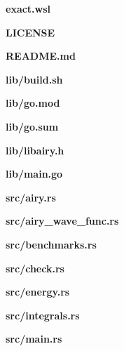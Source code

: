 \documentclass[11pt,DIV=10,final]{scrreprt} %
\begin{document}
{\begin{appendix}
\vspace*{3ex}
{\noindent \large \bfseries exact.wsl}


\vspace*{3ex}
{\noindent \large \bfseries LICENSE}


\vspace*{3ex}
{\noindent \large \bfseries README.md}


\vspace*{3ex}
{\noindent \large \bfseries lib/build.sh}


\vspace*{3ex}
{\noindent \large \bfseries lib/go.mod}


\vspace*{3ex}
{\noindent \large \bfseries lib/go.sum}


\vspace*{3ex}
{\noindent \large \bfseries lib/libairy.h}


\vspace*{3ex}
{\noindent \large \bfseries lib/main.go}


\vspace*{3ex}
{\noindent \large \bfseries src/airy.rs}


\vspace*{3ex}
{\noindent \large \bfseries src/airy\_wave\_func.rs}


\vspace*{3ex}
{\noindent \large \bfseries src/benchmarks.rs}


\vspace*{3ex}
{\noindent \large \bfseries src/check.rs}


\vspace*{3ex}
{\noindent \large \bfseries src/energy.rs}


\vspace*{3ex}
{\noindent \large \bfseries src/integrals.rs}


\vspace*{3ex}
{\noindent \large \bfseries src/main.rs}



\end{appendix}}
\end{document}
